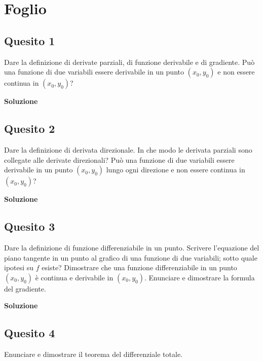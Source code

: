 \chapter{Foglio \ \thechapter}


\section*{Quesito 1}
Dare la definizione di derivate parziali, di funzione derivabile e di gradiente.
Può una funzione di due variabili essere derivabile in un punto $(x_0, y_0)$
 e non essere continua in $(x_0, y_0)$?

\medskip
\begin{large}
\textbf{Soluzione}
\end{large}


\section*{Quesito 2}
Dare la definizione di derivata direzionale. In che modo le derivata parziali
sono collegate alle derivate direzionali? Può una funzione di due variabili essere derivabile
in un punto $(x_0, y_0)$ lungo ogni direzione e non essere continua in $(x_0, y_0)$?



\medskip
\begin{large}
\textbf{Soluzione}
\end{large}


\section*{Quesito 3}
Dare la definizione di funzione differenziabile in un punto. Scrivere l’equazione
del piano tangente in un punto al grafico di una funzione di due variabili; sotto quale
ipotesi su $f$ esiste? Dimostrare che una funzione differenziabile in un punto $(x_0, y_0)$ è
continua e derivabile in $(x_0, y_0)$. Enunciare e dimostrare la formula del gradiente.


\medskip
\begin{large}
\textbf{Soluzione}
\end{large}


\section*{Quesito 4}
Enunciare e dimostrare il teorema del differenziale totale.

